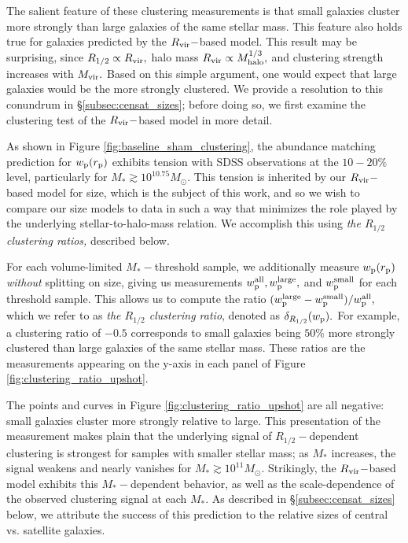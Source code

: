 \documentclass[usenatbib,usegraphicx,letterpaper]{mn2e}
\newcommand{\rhalf}{R_{1/2}}
\newcommand{\mstar}{M_{\ast}}
\newcommand{\mvir}{M_{\rm vir}}
\newcommand{\mhalo}{M_{\rm halo}}
\newcommand{\rvir}{R_{\rm vir}}
\newcommand{\rproj}{r_{\rm p}}
\newcommand{\wproj}{w_{\rm p}}
\newcommand{\wplarge}{w_{\rm p}^{\rm large}}
\newcommand{\wpsmall}{w_{\rm p}^{\rm small}}
\newcommand{\wpall}{w_{\rm p}^{\rm all}}
\newcommand{\msun}{M_\odot}
\begin{document}
The salient feature of these clustering measurements is that small galaxies cluster more strongly than large galaxies of the same stellar mass. This feature also holds true for galaxies predicted by the $\rvir-$based model. This result may be surprising, since $\rhalf\propto\rvir,$ halo mass $\rvir\propto\mhalo^{1/3},$ and clustering strength increases with $\mvir.$ Based on this simple argument, one would expect that large galaxies would be the more strongly clustered. We provide a resolution to this conundrum in \S\ref{subsec:censat_sizes}; before doing so, we first examine the clustering test of the $\rvir-$based model in more detail.

As shown in Figure \ref{fig:baseline_sham_clustering}, the abundance matching prediction for $\wproj(\rproj)$ exhibits tension with SDSS observations at the $10-20\%$ level, particularly for $\mstar\gtrsim10^{10.75}\msun.$ This tension is inherited by our $\rvir-$based model for size, which is the subject of this work, and so we wish to compare our size models to data in such a way that minimizes the role played by the underlying stellar-to-halo-mass relation. We accomplish this using {\em the $\rhalf$ clustering ratios,} described below. 

For each volume-limited $\mstar-$threshold sample, we additionally measure $\wproj(\rproj)$ {\em without} splitting on size, giving us measurements $\wpall, \wplarge,$ and $\wpsmall$ for each threshold sample. This allows us to compute the ratio $(\wplarge-\wpsmall)/\wpall,$ which we refer to as {\em the $\rhalf$ clustering ratio}, denoted as $\delta_{\rhalf}(\wproj).$ For example, a clustering ratio of $-0.5$ corresponds to small galaxies being $50\%$ more strongly clustered than large galaxies of the same stellar mass. These ratios are the measurements appearing on the y-axis in each panel of Figure \ref{fig:clustering_ratio_upshot}. 

The points and curves in Figure \ref{fig:clustering_ratio_upshot} are all negative: small galaxies cluster more strongly relative to large. This presentation of the measurement makes plain that the underlying signal of $\rhalf-$dependent clustering is strongest for samples with smaller stellar mass; as $\mstar$ increases, the signal weakens and nearly vanishes for $\mstar\gtrsim10^{11}\msun.$ Strikingly, the $\rvir-$based model exhibits this $\mstar-$dependent behavior, as well as the scale-dependence of the observed clustering signal at each $\mstar.$ As described in \S\ref{subsec:censat_sizes} below, we attribute the success of this prediction to the relative sizes of central vs. satellite galaxies. 
\end{document}
